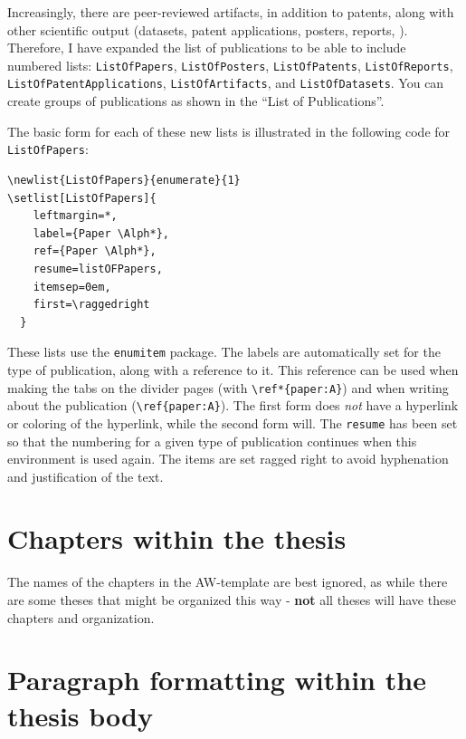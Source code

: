 \documentclass[12pt, twoside]{article}
\begin{document}
Increasingly, there are peer-reviewed artifacts, in addition to patents, along with other scientific output (datasets, patent applications, posters, reports, \etc). Therefore, I have expanded the list of publications to be able to include numbered lists: \texttt{ListOfPapers},  \texttt{ListOfPosters},  \texttt{ListOfPatents},
\texttt{ListOfReports}, \texttt{ListOfPatentApplications},  \texttt{ListOfArtifacts}, and \texttt{ListOfDatasets}. You can create groups of publications as shown in the \enquote{List of Publications}.

The basic form for each of these new lists is illustrated in the following code for \texttt{ListOfPapers}:
\begin{lstlisting}[style=latexExampleForAuthors]
\newlist{ListOfPapers}{enumerate}{1}
\setlist[ListOfPapers]{
    leftmargin=*,
    label={Paper \Alph*},
    ref={Paper \Alph*},
    resume=listOFPapers,
    itemsep=0em,
    first=\raggedright
  }
\end{lstlisting}

These lists use the \texttt{enumitem} package. The labels are automatically set for the type of publication, along with a reference to it. This reference can be used when making the tabs on the divider pages (with \texttt{\textbackslash ref*\{paper:A\}}) and when writing about the publication (\texttt{\textbackslash ref\{paper:A\}}). The first form does \textit{not} have a hyperlink or coloring of the hyperlink, while the second form will. The \texttt{resume} has been set so that the numbering for a given type of publication continues when this environment is used again. The items are set ragged right to avoid hyphenation and justification of the text.

\section{Chapters within the thesis}
\label{sec:cycle3ChaptersWithThesis}

The names of the chapters in the AW-template are best ignored, as while there are some theses that might be organized this way - \textbf{not} all theses will have these chapters and organization.



\section{Paragraph formatting within the thesis body}
\label{sec:cycle3ParagraphFOrmattingQuestionable}
\end{document}
